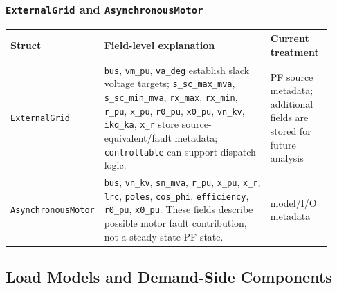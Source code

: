 \subsubsection*{\texttt{ExternalGrid} and \texttt{AsynchronousMotor}}
\begin{longtable}{L{0.20\linewidth}L{0.53\linewidth}L{0.19\linewidth}}
\toprule
Struct & Field-level explanation & Current treatment \\
\midrule
\endhead
\texttt{ExternalGrid} & \texttt{bus}, \texttt{vm\_pu}, \texttt{va\_deg} establish slack voltage targets; \texttt{s\_sc\_max\_mva}, \texttt{s\_sc\_min\_mva}, \texttt{rx\_max}, \texttt{rx\_min}, \texttt{r\_pu}, \texttt{x\_pu}, \texttt{r0\_pu}, \texttt{x0\_pu}, \texttt{vn\_kv}, \texttt{ikq\_ka}, \texttt{x\_r} store source-equivalent/fault metadata; \texttt{controllable} can support dispatch logic. & PF source metadata; additional fields are stored for future analysis \\
\texttt{AsynchronousMotor} & \texttt{bus}, \texttt{vn\_kv}, \texttt{sn\_mva}, \texttt{r\_pu}, \texttt{x\_pu}, \texttt{x\_r}, \texttt{lrc}, \texttt{poles}, \texttt{cos\_phi}, \texttt{efficiency}, \texttt{r0\_pu}, \texttt{x0\_pu}.  These fields describe possible motor fault contribution, not a steady-state PF state. & model/I/O metadata \\
\bottomrule
\end{longtable}

\subsection{Load Models and Demand-Side Components}

